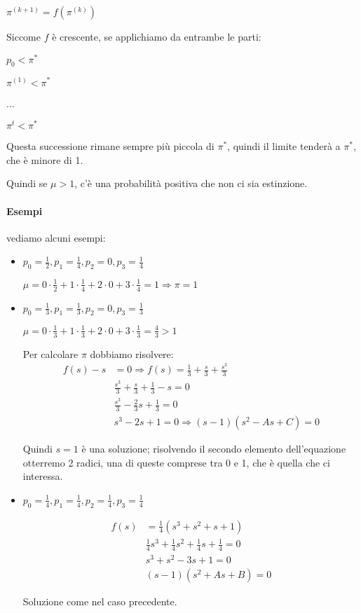 \documentclass[a4paper,12pt]{book}
\begin{document}
$ \pi^{(k+1)} = f(\pi^{(k)}) $

Siccome $ f $ è crescente, se applichiamo da entrambe le parti:

$ p_0 < \pi^* $

$ \pi^{(1)} < \pi^* $

...

$ \pi^t < \pi^* $

Questa successione rimane sempre più piccola di $\pi^*$, quindi il limite tenderà a $ \pi^* $, che è minore di 1.

Quindi se $ \mu > 1$, c'è una probabilità positiva che non ci sia estinzione. 


\paragraph{Esempi} vediamo alcuni esempi:
\begin{itemize}
	\item $ p_0 = \frac{1}{2}, p_1 = \frac{1}{4}, p_2 = 0, p_3 = \frac{1}{4} $
	
	$ \mu = 0 \cdot \frac{1}{2} + 1 \cdot \frac{1}{4} + 2 \cdot 0  + 3 \cdot \frac{1}{4} = 1 \Rightarrow \pi = 1$
	\item $ p_0 = \frac{1}{3}, p_1 = \frac{1}{3}, p_2 = 0, p_3 = \frac{1}{3} $
	
	$ \mu = 0 \cdot \frac{1}{3} + 1 \cdot \frac{1}{3} + 2 \cdot 0  + 3 \cdot \frac{1}{3} = \frac{4}{3} > 1$
	
	Per calcolare $\pi$ dobbiamo risolvere:
	\begin{align*}
		f(s) - s & = 0 \Rightarrow f(s) = \frac{1}{3} + \frac{s}{3} + \frac{s^3}{3} \\
		& \frac{s^3}{3} + \frac{s}{3} + \frac{1}{3} - s = 0 \\
		& \frac{s^3}{3} - \frac{2}{3}s + \frac{1}{3} = 0 \\
		& s^3 - 2s + 1 = 0 \Rightarrow (s-1)(s^2 - As + C) = 0
	\end{align*}
	
	Quindi $ s = 1 $ è una soluzione; risolvendo il secondo elemento dell'equazione otterremo 2 radici, una di queste comprese tra 0 e 1, che è quella che ci interessa. 
	
	\item $ p_0 = \frac{1}{4}, p_1 = \frac{1}{4}, p_2 = \frac{1}{4}, p_3 = \frac{1}{4} $
	
	\begin{align*}
		f(s) & = \frac{1}{4}(s^3 + s^2 + s + 1) \\
		& \frac{1}{4}s^3 + \frac{1}{4}s^2 + \frac{1}{4}s + \frac{1}{4} = 0 \\
		& s^3 + s^2 - 3s + 1 = 0 \\
		& (s-1)(s^2 + As + B) = 0	
	\end{align*}
	
	Soluzione come nel caso precedente. 
\end{itemize}
\end{document}
